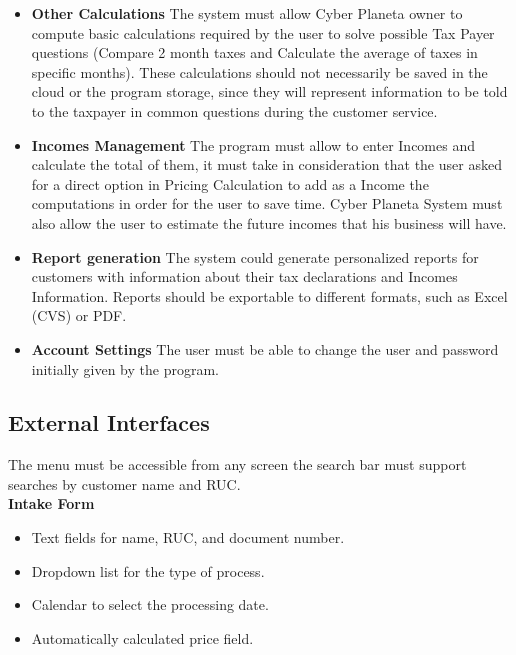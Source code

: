 \documentclass[12pt,a4paper, twosite]{article}
\begin{document}
\begin{itemize}
\item
\textbf {Other Calculations}
The system must allow Cyber Planeta owner to compute basic calculations required by the user to solve possible Tax Payer questions (Compare 2 month taxes and Calculate the average of taxes in specific months).
These calculations should not necessarily be saved in the cloud or the program storage, since they will represent information to be told to the taxpayer in common questions during the customer service.
\end{itemize}

\begin{itemize}
\item
\textbf {Incomes Management}
The program must allow to enter Incomes and calculate the total of them, it must take in consideration that the user asked for a direct option in Pricing Calculation to add as a Income the computations in order for the user to save time.
Cyber Planeta System must also allow the user to estimate the future incomes that his business will have.
\end{itemize}

\begin{itemize}
\item
\textbf {Report generation}
The system could generate personalized reports for customers with information about their tax declarations and Incomes Information. 
Reports should be exportable to different formats, such as Excel (CVS) or PDF. 
\end{itemize}
\begin{itemize}
\item
\textbf {Account Settings}
The user must be able to change the user and password initially given by the program. 
\end{itemize}



\subsection{External Interfaces}
\label{sec:orgfd5391f}

The menu must be accessible from any screen the search bar must support searches by customer name and RUC.\\

\textbf {Intake Form}

\begin{itemize}
\item Text fields for name, RUC, and document number.
\item Dropdown list for the type of process.
\item Calendar to select the processing date.
\item Automatically calculated price field.\\
\end{itemize}
\end{document}
